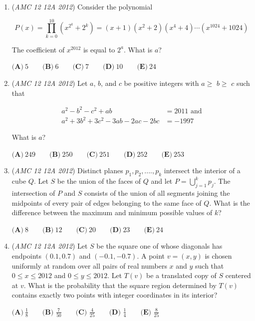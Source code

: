 \begin{enumerate}
 $\textbf{(A)}\ 60 \qquad\textbf{(B)}\ 170 \qquad\textbf{(C)}\ 290 \qquad\textbf{(D)}\ 320 \qquad\textbf{(E)}\ 660$


	\item (\textit{AMC 12 12A 2012}) Consider the polynomial


 
 \[P(x)=\prod_{k=0}^{10}(x^{2^k}+2^k)=(x+1)(x^2+2)(x^4+4)\cdots (x^{1024}+1024)\]


 The coefficient of $x^{2012}$ is equal to $2^a$.  What is $a$?


 $\textbf{(A)}\ 5 \qquad\textbf{(B)}\ 6 \qquad\textbf{(C)}\ 7 \qquad\textbf{(D)}\ 10 \qquad\textbf{(E)}\ 24$


	\item (\textit{AMC 12 12A 2012}) Let $a$, $b$, and $c$ be positive integers with $a\ge$ $b\ge$ $c$ such that

 \begin{align*}a^{2}-b^{2}-c^{2}+ab&=2011\text{ and}\\ a^{2}+3b^{2}+3c^{2}-3ab-2ac-2bc&=-1997 \end{align*}

What is $a$?


 $\textbf{(A)}\ 249\qquad\textbf{(B)}\ 250\qquad\textbf{(C)}\ 251\qquad\textbf{(D)}\ 252\qquad\textbf{(E)}\ 253$


	\item (\textit{AMC 12 12A 2012}) Distinct planes $p_1,p_2,....,p_k$ intersect the interior of a cube $Q$. Let $S$ be the union of the faces of $Q$ and let $P =\bigcup_{j=1}^{k}p_{j}$. The intersection of $P$ and $S$ consists of the union of all segments joining the midpoints of every pair of edges belonging to the same face of $Q$. What is the difference between the maximum and minimum possible values of $k$?


 $\textbf{(A)}\ 8\qquad\textbf{(B)}\ 12\qquad\textbf{(C)}\ 20\qquad\textbf{(D)}\ 23\qquad\textbf{(E)}\ 24$


	\item (\textit{AMC 12 12A 2012}) Let $S$ be the square one of whose diagonals has endpoints $(0.1,0.7)$ and $(-0.1,-0.7)$.  A point $v=(x,y)$ is chosen uniformly at random over all pairs of real numbers $x$ and $y$ such that $0 \le x \le 2012$ and $0\le y\le 2012$.  Let $T(v)$ be a translated copy of $S$ centered at $v$.  What is the probability that the square region determined by $T(v)$ contains exactly two points with integer coordinates in its interior?


 $\textbf{(A)}\ \frac{1}{8}\qquad\textbf{(B) }\frac{7}{50}\qquad\textbf{(C) }\frac{4}{25}\qquad\textbf{(D) }\frac{1}{4}\qquad\textbf{(E) }\frac{8}{25}$



\end{enumerate}
